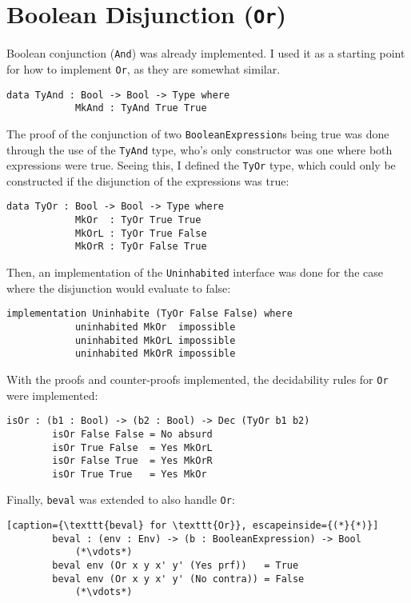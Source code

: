\section{Boolean Disjunction (\texttt{Or})}
    Boolean conjunction (\texttt{And}) was already implemented. I used it as a starting point for how to implement \texttt{Or}, as they are somewhat similar.
    \begin{lstlisting}[caption={The proof type for \texttt{And}}]
        data TyAnd : Bool -> Bool -> Type where
            MkAnd : TyAnd True True
    \end{lstlisting}
    The proof of the conjunction of two \texttt{BooleanExpression}s being true was done through the use of the \texttt{TyAnd} type, who's only constructor was one where both expressions were true. Seeing this, I defined the \texttt{TyOr} type, which could only be constructed if the disjunction of the expressions was true:
    \begin{lstlisting}[caption={The proof type for \texttt{Or}}]
        data TyOr : Bool -> Bool -> Type where
            MkOr  : TyOr True True
            MkOrL : TyOr True False
            MkOrR : TyOr False True
    \end{lstlisting}
    Then, an implementation of the \texttt{Uninhabited} interface was done for the case where the disjunction would evaluate to false:
    \begin{lstlisting}[caption={\texttt{Or False False} is impossible}]
        implementation Uninhabite (TyOr False False) where
            uninhabited MkOr  impossible
            uninhabited MkOrL impossible
            uninhabited MkOrR impossible
    \end{lstlisting}
    With the proofs and counter-proofs implemented, the decidability rules for \texttt{Or} were implemented:
    \begin{lstlisting}[caption={Decidability rules for \texttt{Or}}]
        isOr : (b1 : Bool) -> (b2 : Bool) -> Dec (TyOr b1 b2)
        isOr False False = No absurd
        isOr True False  = Yes MkOrL
        isOr False True  = Yes MkOrR
        isOr True True   = Yes MkOr
    \end{lstlisting}
    Finally, \texttt{beval} was extended to also handle \texttt{Or}:
    \begin{lstlisting}[caption={\texttt{beval} for \texttt{Or}}, escapeinside={(*}{*)}]
        beval : (env : Env) -> (b : BooleanExpression) -> Bool
            (*\vdots*)
        beval env (Or x y x' y' (Yes prf))   = True
        beval env (Or x y x' y' (No contra)) = False
            (*\vdots*)
    \end{lstlisting}
    
